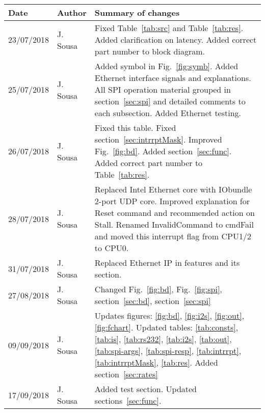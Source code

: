 \documentclass{rep}
\theoremstyle{plain}
\begin{document}
\begin{table}[H]
  \begin{center}
    \begin{tabular}{|l|l|p{8cm}|}
      \hline
      \rowcolor{iob-green}
      \textbf{Date} & \textbf{Author} & \textbf{Summary of changes} \\
      \hline
      \hline
      
     23/07/2018 & J. Sousa & Fixed Table~\ref{tab:src} and
     Table~\ref{tab:res}. Added clarification on latency. Added
     correct part number to block diagram.\\ \hline

     \rowcolor{iob-blue} 25/07/2018 & J.  Sousa & Added symbol in
     Fig.~\ref{fig:symb}. Added Ethernet interface signals and explanations. All
     SPI operation material grouped in section~\ref{sec:spi} and detailed
     comments to each subsection. Added Ethernet testing.\\ \hline

     26/07/2018 & J. Sousa & Fixed this table. Fixed
     section~\ref{sec:intrrptMask}. Improved Fig.~\ref{fig:bd}. Added
     section~\ref{sec:func}. Added correct part number to
     Table~\ref{tab:res}.\\ \hline

     \rowcolor{iob-blue} 28/07/2018 & J. Sousa & Replaced Intel Ethernet core with
     IObundle 2-port UDP core. Improved explanation for Reset command
     and recommended action on Stall. Renamed InvalidCommand to
     cmdFail and moved this interrupt flag from CPU1/2 to
     CPU0.\\ \hline
    
     31/07/2018 & J. Sousa & Replaced Ethernet IP
     in features and its section.\\ \hline

     \rowcolor{iob-blue} 27/08/2018 & J. Sousa & Changed Fig.~\ref{fig:bd},
     Fig.~\ref{fig:spi}, section~\ref{sec:bd}, section~\ref{sec:spi}\\ \hline

     09/09/2018 & J. Sousa & Updates figures: \ref{fig:bd}, \ref{fig:i2s},
     \ref{fig:out}, \ref{fig:fchart}. Updated tables: \ref{tab:consts},
     \ref{tab:is}, \ref{tab:rs232}, \ref{tab:i2s}, \ref{tab:out},
     \ref{tab:spi-args}, \ref{tab:spi-resp}, \ref{tab:intrrpt},
     \ref{tab:intrrptMask}, \ref{tab:res}. Added
     section~\ref{sec:rates}\\ \hline

     \rowcolor{iob-blue} 17/09/2018 & J. Sousa & Added test section. Updated
     sections~\ref{sec:func}.\\ \hline


\end{tabular}
\end{center}
\end{table}
\end{document}
